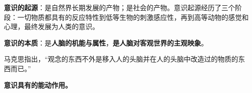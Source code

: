 \textbf{{意识的起源}}：是自然界长期发展的产物；是社会的产物。意识起源经历了三个阶段：一切物质都具有的反应特性到低等生物的刺激感应性，再到高等动物的感觉和心理，最终发展为人类的意识。

\textbf{{意识的本质}}{{：}是}\textbf{{人脑的机能与属性}}{，}\textbf{{是人脑对客观世界的主观映象}}{。}

{马克思指出，``观念的东西不外是移入人的头脑并在人的头脑中改造过的物质的东西而已。''}

\textbf{{意识具有的能动作用。}}
